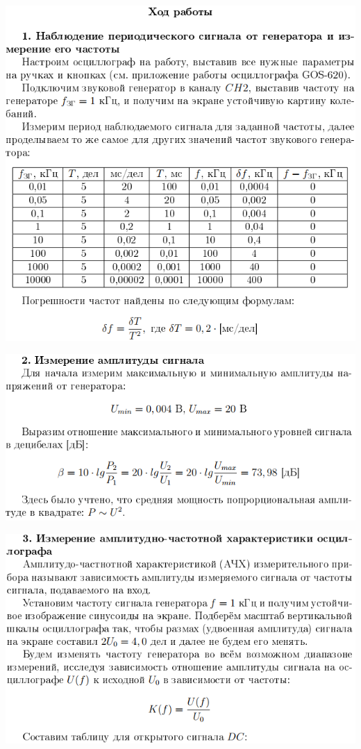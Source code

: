 \documentclass[a4paper,12pt]{article} %
\begin{document}
\begin{center}
\includegraphics{8}
\end{center}
\begin{center}
\includegraphics{9}
\end{center}

\begin{center}
\includegraphics{11}
\end{center}
\end{document}
